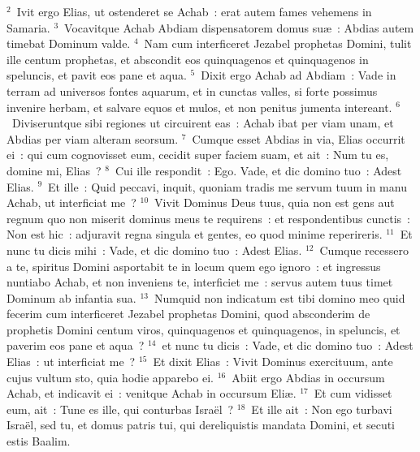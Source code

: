 ${}^{2}$~Ivit ergo Elias, ut ostenderet se Achab~: erat autem fames vehemens in Samaria.
${}^{3}$~Vocavitque Achab Abdiam dispensatorem domus su\ae~: Abdias autem timebat Dominum valde.
${}^{4}$~Nam cum interficeret Jezabel prophetas Domini, tulit ille centum prophetas, et abscondit eos quinquagenos et quinquagenos in speluncis, et pavit eos pane et aqua.
${}^{5}$~Dixit ergo Achab ad Abdiam~: Vade in terram ad universos fontes aquarum, et in cunctas valles, si forte possimus invenire herbam, et salvare equos et mulos, et non penitus jumenta intereant.
${}^{6}$~Diviseruntque sibi regiones ut circuirent eas~: Achab ibat per viam unam, et Abdias per viam alteram seorsum.
${}^{7}$~Cumque esset Abdias in via, Elias occurrit ei~: qui cum cognovisset eum, cecidit super faciem suam, et ait~: Num tu es, domine mi, Elias~?
${}^{8}$~Cui ille respondit~: Ego. Vade, et dic domino tuo~: Adest Elias.
${}^{9}$~Et ille~: Quid peccavi, inquit, quoniam tradis me servum tuum in manu Achab, ut interficiat me~?
${}^{10}$~Vivit Dominus Deus tuus, quia non est gens aut regnum quo non miserit dominus meus te requirens~: et respondentibus cunctis~: Non est hic~: adjuravit regna singula et gentes, eo quod minime reperireris.
${}^{11}$~Et nunc tu dicis mihi~: Vade, et dic domino tuo~: Adest Elias.
${}^{12}$~Cumque recessero a te, spiritus Domini asportabit te in locum quem ego ignoro~: et ingressus nuntiabo Achab, et non inveniens te, interficiet me~: servus autem tuus timet Dominum ab infantia sua.
${}^{13}$~Numquid non indicatum est tibi domino meo quid fecerim cum interficeret Jezabel prophetas Domini, quod absconderim de prophetis Domini centum viros, quinquagenos et quinquagenos, in speluncis, et paverim eos pane et aqua~?
${}^{14}$~et nunc tu dicis~: Vade, et dic domino tuo~: Adest Elias~: ut interficiat me~?
${}^{15}$~Et dixit Elias~: Vivit Dominus exercituum, ante cujus vultum sto, quia hodie apparebo ei.
${}^{16}$~Abiit ergo Abdias in occursum Achab, et indicavit ei~: venitque Achab in occursum Eli\ae .
${}^{17}$~Et cum vidisset eum, ait~: Tune es ille, qui conturbas Isra\"el~?
${}^{18}$~Et ille ait~: Non ego turbavi Isra\"el, sed tu, et domus patris tui, qui dereliquistis mandata Domini, et secuti estis Baalim.


